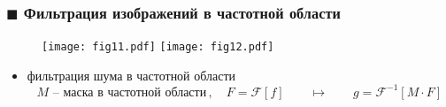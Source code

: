 \documentclass[
    12pt, 
    usepdftitle=false,
    aspectratio=1610
]{beamer}
\begin{document}

\begin{frame}
\frametitle{$\blacksquare$ Фильтрация изображений в частотной области}
\begin{figure}
    \centering
    \texttt{[image: fig11.pdf]}
    \texttt{[image: fig12.pdf]}
\end{figure}
\begin{itemize}
    \item фильтрация шума в частотной области
    $$
        M\,\,\mbox{-- маска в частотной области}\,,\quad F=\mathcal{F}[f]
        \qquad\mapsto\qquad 
        g =\mathcal{F}^{-1}[M\cdot F]
    $$
\end{itemize}
\end{frame}

\end{document}
